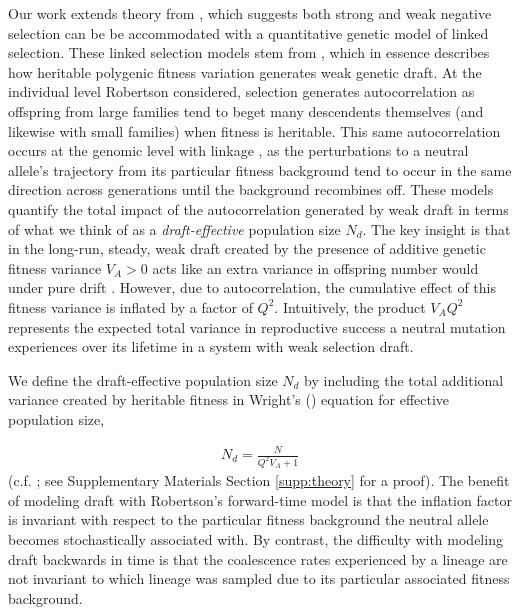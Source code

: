 \documentclass[11pt]{article}
\begin{document}
Our work extends theory from \textcite{Santiago2016-mu}, which suggests both
strong and weak negative selection can be be accommodated with a quantitative
genetic model of linked selection. These linked selection models stem from
\textcite{Robertson1961-ho}, which in essence describes how heritable polygenic
fitness variation generates weak genetic draft. At the individual level
Robertson considered, selection generates autocorrelation as offspring from
large families tend to beget many descendents themselves (and likewise with
small families) when fitness is heritable. This same autocorrelation occurs at
the genomic level with linkage \parencite{Santiago1998-bs,Barton2000-zg}, as
the perturbations to a neutral allele's trajectory from its particular fitness
background tend to occur in the same direction across generations until the
background recombines off. These models quantify the total impact of the
autocorrelation generated by weak draft in terms of what we think of as a
\emph{draft-effective} population size $N_d$. The key insight is that in the
long-run, steady, weak draft created by the presence of additive genetic
fitness variance $V_A > 0$ acts like an extra variance in offspring number
would under pure drift \parencite{Wright1938-tv}. However, due to
autocorrelation, the cumulative effect of this fitness variance is inflated by
a factor of $Q^2$. Intuitively, the product $V_A Q^2$ represents the expected
total variance in reproductive success a neutral mutation experiences over its
lifetime in a system with weak selection draft. 

We define the draft-effective population size $N_d$ by including the total
additional variance created by heritable fitness in Wright's
(\citeyear{Wright1938-tv}) equation for effective population size,

\begin{align}
    \label{eq:main_Ne}
    N_d = \frac{N}{Q^2 V_A + 1}
\end{align}
%
(c.f. \cite{Robertson1961-ho,Santiago1995-hx}; see Supplementary Materials Section
\ref{supp:theory} for a proof). The benefit of modeling draft with Robertson's
forward-time model is that the inflation factor is invariant with respect to
the particular fitness background the neutral allele becomes stochastically
associated with. By contrast, the difficulty with modeling draft backwards in
time is that the coalescence rates experienced by a lineage are not invariant
to which lineage was sampled due to its particular associated fitness
background.
\end{document}
